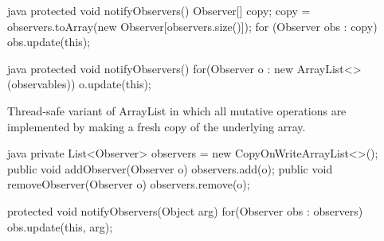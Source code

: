 \begin{codeboxNl}{java}
protected void notifyObservers(){
  Observer[] copy;
  copy = observers.toArray(new Observer[observers.size()]);
  for (Observer obs : copy){
    obs.update(this);
  }
}
\end{codeboxNl}
\begin{codeboxNl}[Alternative]{java}
protected void notifyObservers(){
  for(Observer o : new ArrayList<>(observables)){
    o.update(this);
  }
}
\end{codeboxNl}
\begin{defnbox}\nospacing
  \begin{defn}
    Thread-safe variant of ArrayList in which
    all mutative operations are implemented by making a fresh copy of the
    underlying array.
  \end{defn}
\end{defnbox}
\begin{codeboxNl}{java}
  private List<Observer> observers = new CopyOnWriteArrayList<>();
  public void addObserver(Observer o) { observers.add(o); }
  public void removeObserver(Observer o) { observers.remove(o); }

  protected void notifyObservers(Object arg) {
    for(Observer obs : observers) {
      obs.update(this, arg);
    }
  }
\end{codeboxNl}
